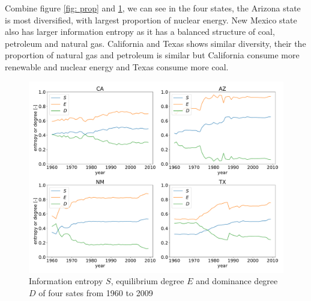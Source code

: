 Combine figure \ref{fig: prop} and \ref{fig: SED}, we can see in  the four states, the Arizona state is most diversified, with largest proportion of nuclear energy. New Mexico state also has larger information entropy as it has a balanced structure of coal, petroleum and natural gas. California and Texas shows similar diversity, their the proportion of natural gas and petroleum is similar but California consume more renewable and nuclear energy and Texas consume more coal. 
\begin{figure}[H] 
    \centering 
    \includegraphics[width=0.6\linewidth]{fig/entropy.pdf}
    \caption{Information entropy $S$, equilibrium degree $E$ and dominance degree $D$ of four sates from 1960 to 2009}
    \label{fig: SED}
\end{figure}

